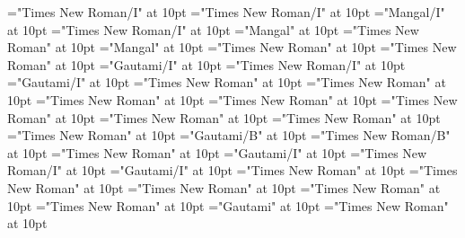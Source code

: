 \documentclass[a4paper]{article}
\begin{document}
\font\grammaticalinfosensesentryletDatadicBody="Times New Roman/I" at 10pt
\font\spanengrammaticalinfosensesentryletDatadicBody="Times New Roman/I" at 10pt
\font\partofspeechLehigrammaticalinfosensesentryletDatadicBody="Mangal/I" at 10pt
\font\spanenpartofspeechLehigrammaticalinfosensesentryletDatadicBody="Times New Roman/I" at 10pt
\font{}="Mangal" at 10pt
\font\spanendefinitionLehisensesentryletDatadicBody="Times New Roman" at 10pt
\font\spanhidefinitionLehisensesentryletDatadicBody="Mangal" at 10pt
\font\examplessensesentryletDatadicBody="Times New Roman" at 10pt
\font\spanenexamplessensesentryletDatadicBody="Times New Roman" at 10pt
\font\exampleggoTeluINexamplessensesentryletDatadicBody="Gautami/I" at 10pt
\font\spanenexampleggoTeluINexamplessensesentryletDatadicBody="Times New Roman/I" at 10pt
\font\spanggoTeluINexampleggoTeluINexamplessensesentryletDatadicBody="Gautami/I" at 10pt
\font\primaryrefssensesentryletDatadicBody="Times New Roman" at 10pt
\font\spanenprimaryrefssensesentryletDatadicBody="Times New Roman" at 10pt
\font\complexformprimaryrefssensesentryletDatadicBody="Times New Roman" at 10pt
\font\complexformentrytypecomplexformprimaryrefssensesentryletDatadicBody="Times New Roman" at 10pt
\font\LexEntryTypepublishAbbreviationForReversalAbbreviationPubencomplexformentrytypecomplexformprimaryrefssensesentryletDatadicBody="Times New Roman" at 10pt
\font\spanenLexEntryTypepublishAbbreviationForReversalAbbreviationPubencomplexformentrytypecomplexformprimaryrefssensesentryletDatadicBody="Times New Roman" at 10pt
\font\complexformcomponentscomplexformprimaryrefssensesentryletDatadicBody="Times New Roman" at 10pt
\font\acomplexformcomponentscomplexformprimaryrefssensesentryletDatadicBody="Times New Roman" at 10pt
\font\mainentryrefggoTeluINacomplexformcomponentscomplexformprimaryrefssensesentryletDatadicBody="Gautami/B" at 10pt
\font\spanenmainentryrefggoTeluINacomplexformcomponentscomplexformprimaryrefssensesentryletDatadicBody="Times New Roman/B" at 10pt
\font\xitemexamplessensesentryletDatadicBody="Times New Roman" at 10pt
\font\exampleggoTeluINxitemexamplessensesentryletDatadicBody="Gautami/I" at 10pt
\font\spanenexampleggoTeluINxitemexamplessensesentryletDatadicBody="Times New Roman/I" at 10pt
\font\spanggoTeluINexampleggoTeluINxitemexamplessensesentryletDatadicBody="Gautami/I" at 10pt
\font\complexformrefssensesentryletDatadicBody="Times New Roman" at 10pt
\font\spanencomplexformrefssensesentryletDatadicBody="Times New Roman" at 10pt
\font\complexformrefcomplexformrefssensesentryletDatadicBody="Times New Roman" at 10pt
\font\complexformrefentrytypecomplexformrefcomplexformrefssensesentryletDatadicBody="Times New Roman" at 10pt
\font\spanencomplexformrefentrytypecomplexformrefcomplexformrefssensesentryletDatadicBody="Times New Roman" at 10pt
\font\complexformrefheadwordggoTeluINcomplexformrefcomplexformrefssensesentryletDatadicBody="Gautami" at 10pt
\font\spanencomplexformrefheadwordggoTeluINcomplexformrefcomplexformrefssensesentryletDatadicBody="Times New Roman" at 10pt
\end{document}
